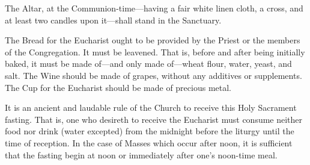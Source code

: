 \begin{rubric}
The Altar, at the Communion-time---having a fair white linen cloth, a cross, and at least two candles upon it---shall stand in the Sanctuary.
\end{rubric}
\begin{rubric}
The Bread for the Eucharist ought to be provided by the Priest or the members of the Congregation. It must be leavened. That is, before and after being initially baked, it must be made of---and only made of---wheat flour, water, yeast, and salt. The Wine should be made of grapes, without any additives or supplements. The Cup for the Eucharist should be made of precious metal.
\end{rubric}
\begin{rubric}
It is an ancient and laudable rule of the Church to receive this Holy Sacrament fasting. That is, one who desireth to receive the Eucharist must consume neither food nor drink (water excepted) from the midnight before the liturgy until the time of reception. In the case of Masses which occur after noon, it is sufficient that the fasting begin at noon or immediately after one's noon-time meal.
\end{rubric}

